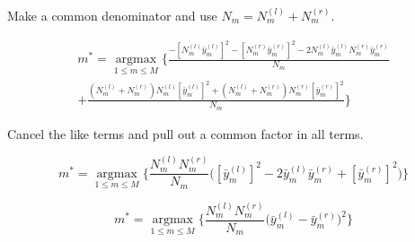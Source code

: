 \documentclass[11pt]{article}
\begin{document}
Make a common denominator and use $N_m = N_m^{(l)} + N_m^{(r)}$.

\begin {equation}
\begin{split}
m^* = \underset{1 \leq m \leq M}{\operatorname{argmax}} \Bigg\{\frac{-[N_m^{(l)}\bar{y}_m^{(l)}]^2 - [N_m^{(r)}\bar{y}_m^{(r)}]^2-2N_m^{(l)}\bar{y}_m^{(l)}N_m^{(r)}\bar{y}_m^{(r)}}{N_m}\\ + \frac{(N_m^{(l)}+ N_m^{(r)})N_m^{(l)}[\bar{y}_m^{(l)}]^2 + (N_m^{(l)}+N_m^{(r)})N_m^{(r)}[\bar{y}_m^{(r)}]^2}{N_m}\Bigg\}
\end{split}
\end{equation}

Cancel the like terms and pull out a common factor in all terms. 

\begin{equation}
m^* = \underset{1 \leq m \leq M}{\operatorname{argmax}} \Bigg\{\frac{N_m^{(l)}N_m^{(r)}}{N_m}\Big([\bar{y}_m^{(l)}]^2-2\bar{y}_m^{(l)}\bar{y}_m^{(r)} + [\bar{y}_m^{(r)}]^2\Big)\Bigg \}
\end{equation}

\begin{equation}
m^* = \underset{1 \leq m \leq M}{\operatorname{argmax}} \Bigg\{\frac{N_m^{(l)}N_m^{(r)}}{N_m}\Big(\bar{y}_m^{(l)} - \bar{y}_m^{(r)}\Big)^2\Bigg \}
\end{equation}
\end{document}
